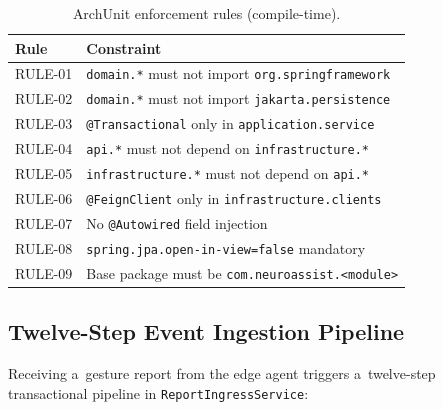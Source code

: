 \begin{table}[htbp]
\centering
\caption{ArchUnit enforcement rules (compile-time).}
\label{tab:archunit}
\begin{tabular}{ll}
\toprule
Rule & Constraint \\
\midrule
RULE-01 & \texttt{domain.*} must not import \texttt{org.springframework} \\
RULE-02 & \texttt{domain.*} must not import \texttt{jakarta.persistence} \\
RULE-03 & \texttt{@Transactional} only in \texttt{application.service} \\
RULE-04 & \texttt{api.*} must not depend on \texttt{infrastructure.*} \\
RULE-05 & \texttt{infrastructure.*} must not depend on \texttt{api.*} \\
RULE-06 & \texttt{@FeignClient} only in \texttt{infrastructure.clients} \\
RULE-07 & No \texttt{@Autowired} field injection \\
RULE-08 & \texttt{spring.jpa.open-in-view=false} mandatory \\
RULE-09 & Base package must be \texttt{com.neuroassist.<module>} \\
\bottomrule
\end{tabular}
\end{table}

\subsection{Twelve-Step Event Ingestion Pipeline}
\label{sec:ingestion}

Receiving a~gesture report from the edge agent triggers a~twelve-step transactional
pipeline in \texttt{ReportIngressService}:

